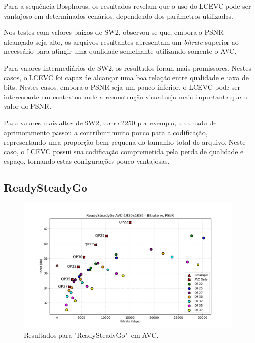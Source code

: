 Para a sequência Bosphorus, os resultados revelam que o uso do \acrshort{LCEVC} pode
ser vantajoso em determinados cenários, dependendo dos parâmetros utilizados.

Nos testes com valores baixos de SW2, observou-se que, embora o \acrshort{PSNR} 
alcançado seja alto, os arquivos resultantes apresentam um \textit{bitrate}
superior ao necessário para atingir uma qualidade semelhante utilizando
somente o \acrshort{AVC}. 

Para valores intermediários de SW2, os resultados foram mais promissores. Nestes
casos, o \acrshort{LCEVC} foi capaz de alcançar uma boa relação entre qualidade
e taxa de bits. Nestes casos, embora o \acrshort{PSNR} seja um pouco inferior,
o \acrshort{LCEVC} pode ser interessante em contextos onde a reconstrução visual
seja mais importante que o valor do \acrshort{PSNR}.

Para valores mais altos de SW2, como 2250 por exemplo, a camada de aprimoramento
passou a contribuir muito pouco para a codificação, representando uma proporção
bem pequena do tamanho total do arquivo. Neste caso, o \acrshort{LCEVC} possui
sua codificação comprometida pela perda de qualidade e espaço, tornando estas
configurações pouco vantajosas.

\subsection{ReadySteadyGo}

\begin{figure}[h]
    \centering
    \includegraphics[width=1.0\textwidth]{img/ReadySteadyGo-AVC.png}
    \caption{Resultados para "ReadySteadyGo"\ em \acrshort{AVC}. \cite{uvg_dataset}}
    \label{fig:RSG}
\end{figure}

